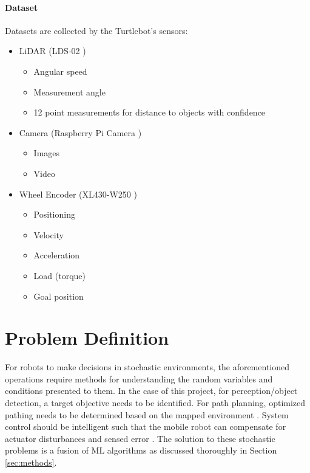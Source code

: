 \documentclass{article}
\begin{document}
\paragraph{Dataset} Datasets are collected by the Turtlebot's sensors:
\begin{itemize}
    \item LiDAR (LDS-02 \cite{lds02})
    \begin{itemize}
        \item Angular speed
        \item Measurement angle
        \item 12 point measurements for distance to objects with confidence
    \end{itemize}
    \newpage
    \item Camera (Raspberry Pi Camera \cite{camera})
    \begin{itemize}
        \item Images
        \item Video
    \end{itemize}
    \item Wheel Encoder (XL430-W250 \cite{encoders})
    \begin{itemize}
        \item Positioning
        \item Velocity
        \item Acceleration
        \item Load (torque)
        \item Goal position
    \end{itemize}

\end{itemize}

\section{Problem Definition} \label{sec:problem definition}
For robots to make decisions in stochastic environments, the aforementioned operations require methods for understanding the random variables and conditions presented to them. In the case of this project, for perception/object detection, a target objective needs to be identified. For path planning, optimized pathing needs to be determined based on the mapped environment \cite{lidar_path_planning}. System control should be intelligent such that the mobile robot can compensate for actuator disturbances and sensed error \cite{control_CNN}. The solution to these stochastic problems is a fusion of ML algorithms as discussed thoroughly in Section \ref{sec:methods}. 
\end{document}
